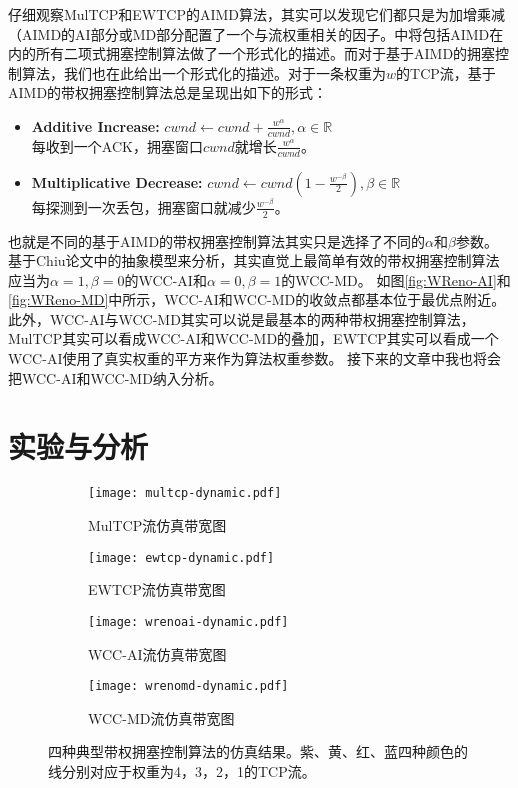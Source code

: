 \documentclass[winfonts]{njuthesis}
\begin{document}
仔细观察MulTCP和EWTCP的AIMD算法，其实可以发现它们都只是为加增乘减（AIMD的AI部分或MD部分配置了一个与流权重相关的因子。\cite{bansal2001binomial}中将包括AIMD在内的所有二项式拥塞控制算法做了一个形式化的描述。而对于基于AIMD的拥塞控制算法，我们也在此给出一个形式化的描述。对于一条权重为$w$的TCP流，基于AIMD的带权拥塞控制算法总是呈现出如下的形式：
\begin{itemize}
  \item {\bf Additive Increase:} $cwnd \leftarrow cwnd + \frac{w^\alpha}{cwnd}, \alpha \in \mathbb{R}$ \\
  每收到一个ACK，拥塞窗口$cwnd$就增长$\frac{w^\alpha}{cwnd}$。
  \item {\bf Multiplicative Decrease:} $cwnd \leftarrow cwnd (1 - \frac{w^{-\beta}}{2}), \beta \in \mathbb{R}$ \\
  每探测到一次丢包，拥塞窗口就减少$\frac{w^{-\beta}}{2}$。
\end{itemize}
也就是不同的基于AIMD的带权拥塞控制算法其实只是选择了不同的$\alpha$和$\beta$参数。
基于Chiu论文\cite{chiu1989analysis}中的抽象模型来分析，其实直觉上最简单有效的带权拥塞控制算法应当为$\alpha=1,\beta=0$的WCC-AI和$\alpha=0,\beta=1$的WCC-MD。
如图\ref{fig:WReno-AI}和\ref{fig:WReno-MD}中所示，WCC-AI和WCC-MD的收敛点都基本位于最优点附近。
此外，WCC-AI与WCC-MD其实可以说是最基本的两种带权拥塞控制算法，MulTCP其实可以看成WCC-AI和WCC-MD的叠加，EWTCP其实可以看成一个WCC-AI使用了真实权重的平方来作为算法权重参数。
接下来的文章中我也将会把WCC-AI和WCC-MD纳入分析。

\chapter{实验与分析}\label{chapter:analysis}

\begin{figure*}[tp]
	\centering
  \begin{subfigure}{.6\textwidth}
    \centering
		\texttt{[image: multcp-dynamic.pdf]}
    \label{fig:MulTCPPerformance}
    \caption{MulTCP流仿真带宽图}
  \end{subfigure}
  \begin{subfigure}{.6\textwidth}
    \centering
		\texttt{[image: ewtcp-dynamic.pdf]}
    \label{fig:EWTCPPerformance}
    \caption{EWTCP流仿真带宽图}
	\end{subfigure}
  \begin{subfigure}{.6\textwidth}
    \centering
		\texttt{[image: wrenoai-dynamic.pdf]}
    \label{fig:WReno-AIPerformance}
    \caption{WCC-AI流仿真带宽图}
  \end{subfigure}
  \begin{subfigure}{.6\textwidth}
    \centering
		\texttt{[image: wrenomd-dynamic.pdf]}
    \label{fig:WReno-MDPerformance}
    \caption{WCC-MD流仿真带宽图}
	\end{subfigure}
	\caption{四种典型带权拥塞控制算法的仿真结果。紫、黄、红、蓝四种颜色的线分别对应于权重为4，3，2，1的TCP流。}
	\label{fig:Performance}
\end{figure*}
\end{document}
